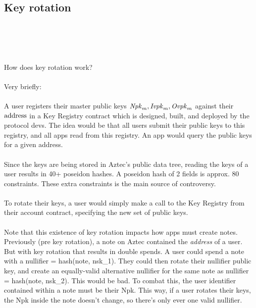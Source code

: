 \subsection{Key rotation}

\\
\\
\\
\\
How does key rotation work?\\
\\
Very briefly:\\
\\
A user registers their master public keys $\Npkm, \Ivpkm, \Ovpkm$ against their $\address$ in a Key Registry contract which is designed, built, and deployed by the protocol devs.
The idea would be that all users submit their public keys to this registry, and all apps read from this registry. An app would query the public keys for a given address.\\
\\
Since the keys are being stored in Aztec's public data tree, reading the keys of a user results in 40+ poseidon hashes.
A poseidon hash of 2 fields is approx. 80 constraints.
These extra constraints is the main source of controversy.\\
\\
To rotate their keys, a user would simply make a call to the Key Registry from their account contract, specifying the new set of public keys.\\
\\
Note that this existence of key rotation impacts how apps must create notes.
Previously (pre key rotation), a note on Aztec contained the \textit{address} of a user.
But with key rotation that results in double spends.
A user could spend a note with a nullifier = hash(note, nsk\_1).
They could then rotate their nullifier public key, and create an equally-valid alternative nullifier for the same note as nullifier = hash(note, nsk\_2).
This would be bad.
To combat this, the user identifier contained within a note must be their Npk.
This way, if a user rotates their keys, the Npk inside the note doesn't change, so there's only ever one valid nullifier.

